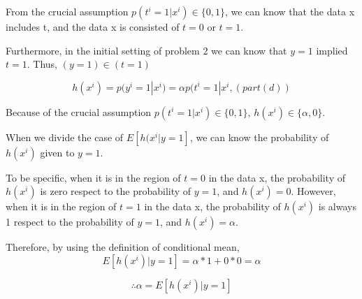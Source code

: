 \begin{answer}
    From the crucial assumption $p(t^{i} = 1|x^{i}) \in \{0,1\}$,
    we can know that the data x includes t, and the data x is consisted of $t = 0$ or $t = 1$.
    
    Furthermore, in the initial setting of problem 2 we can know that $y = 1$ implied $t = 1$. Thus, $(y = 1) \in (t = 1)$
    
    \begin{equation*}
        h(x^{i}) = p(y^{i} = 1| x ^{i}) = \alpha p(t^{i} = 1|x^{i}
        , (part (d))
    \end{equation*}
    
    Because of the crucial assumption $p(t^{i} = 1|x^{i}) \in \{0,1\}$, $h(x^{i}) \in \{\alpha, 0\}$.
    
    When we divide the case of $E[h(x^{i}|y=1]$, we can know the probability of $h(x^{i})$ given to $y = 1$.
    
    To be specific, when it is in the region of $t = 0$ in the data x, the probability of $h(x^{i})$ is zero respect to the probability of $y = 1$, and $h(x^{i}) = 0$. However, when it is in the region of $t = 1$ in the data x, the probability of $h(x^{i})$ is always 1 respect to the probability of $y = 1$, and $h(x^{i}) = \alpha$. 
    
    Therefore, by using the definition of conditional mean,
    \begin{equation*}
        E[h(x^{i})|y = 1] = \alpha *1 + 0*0 = \alpha
    \end{equation*}
    
    \begin{equation*}
        \therefore \alpha = E[h(x^{i})|y = 1]
    \end{equation*}
    

\end{answer}
